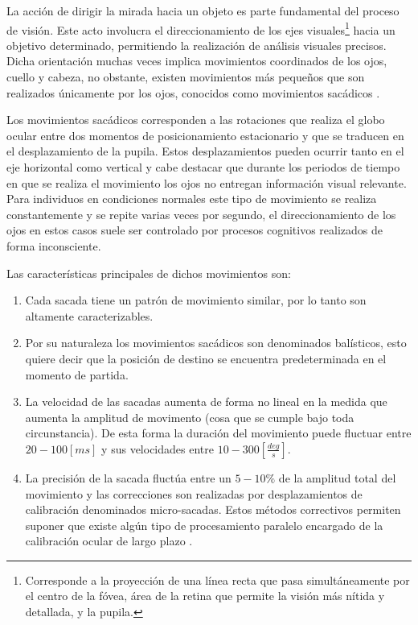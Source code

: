\documentclass[../main.tex]{subfiles}
\begin{document}
		La acción de dirigir la mirada hacia un objeto es parte fundamental del proceso de visión. Este acto involucra el direccionamiento de los ejes visuales\footnote{Corresponde a la proyección de una línea recta que pasa simultáneamente por el centro de la fóvea, área de la retina que permite la visión más nítida y detallada, y la pupila.} hacia un objetivo determinado, permitiendo la realización de análisis visuales precisos. Dicha orientación muchas veces implica movimientos coordinados de los ojos, cuello y cabeza, no obstante, existen movimientos más pequeños que son realizados únicamente por los ojos, conocidos como movimientos sacádicos \cite{article:movOcular, website:movOcular}.

		Los movimientos sacádicos corresponden a las rotaciones que realiza el globo ocular entre dos momentos de posicionamiento estacionario y que se traducen en el desplazamiento de la pupila. Estos desplazamientos pueden ocurrir tanto en el eje horizontal como vertical y cabe destacar que durante los periodos de tiempo en que se realiza el movimiento los ojos no entregan información visual relevante. Para individuos en condiciones normales este tipo de movimiento se realiza constantemente y se repite varias veces por segundo, el direccionamiento de los ojos en estos casos suele ser controlado por procesos cognitivos realizados de forma inconsciente.

		Las características principales de dichos movimientos son:
		\begin{enumerate}
			\item Cada sacada tiene un patrón de movimiento similar, por lo tanto son altamente caracterizables.

			\item Por su naturaleza los movimientos sacádicos son denominados balísticos, esto quiere decir que la posición de destino se encuentra predeterminada en el momento de partida. 

			\item La velocidad de las sacadas aumenta de forma no lineal en la medida que aumenta la amplitud de movimento (cosa que se cumple bajo toda circunstancia). De esta forma la duración del movimiento puede fluctuar entre $20 - 100[ms]$ y sus velocidades entre $10 - 300 [\frac{deg}{s}]$.

			\item La precisión de la sacada fluctúa entre un $5-10\%$ de la amplitud total del movimiento y las correcciones son realizadas por desplazamientos de calibración denominados micro-sacadas. Estos métodos correctivos permiten suponer que existe algún tipo de procesamiento paralelo encargado de la calibración ocular de largo plazo \cite{website:movOcular}.  

		\end{enumerate}
\end{document}
